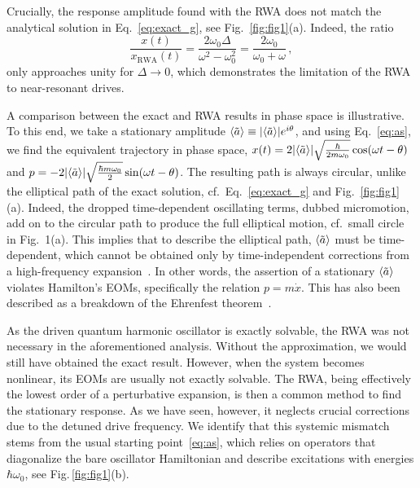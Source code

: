 Crucially, the response amplitude found with the RWA does not match the analytical solution in Eq.~\eqref{eq:exact_g}, see Fig.~\ref{fig:fig1}(a). Indeed, the ratio
\begin{equation}
\frac{x(t)}{x_{\text{RWA}}(t)} = \frac{2\omega_0\Delta}{\omega^2-\omega_0^2}= \frac{2\omega_0}{\omega_0+\omega}\,,
\end{equation}
only approaches unity for $\Delta \rightarrow 0$, which demonstrates the limitation of the RWA to near-resonant drives. 

A comparison  between the exact and RWA results in phase space is illustrative. To this end, we take a stationary amplitude $\langle\tilde{a}\rangle \equiv \abs{\langle\tilde{a}\rangle} e^{i \theta}$, and using Eq.~\eqref{eq:as}, we find the equivalent trajectory in phase space, $x(t) = 2\abs{\langle\tilde{a}\rangle} \sqrt{\frac{\hbar}{2 m \omega_0}} \cos(\omega t - \theta)$ and $p = -2\abs{\langle\tilde{a}\rangle}\sqrt{\frac{\hbar m \omega_0}{2}} \sin(\omega t-\theta)$. The resulting path is always circular, unlike the elliptical path of the exact solution, cf.~Eq.~\eqref{eq:exact_g} and Fig.~\ref{fig:fig1}(a).
Indeed, the dropped time-dependent oscillating terms, dubbed micromotion, add on to the circular path to produce the full elliptical motion, cf.~small circle in Fig.~1(a). This implies that to describe the elliptical path, $\langle\tilde{a}\rangle$ must be time-dependent, which cannot be obtained only by time-independent corrections from a high-frequency expansion~\cite{Mikami2016, Eckardt2017,Eckardt2015,Bukov2015,Goldman2014}.  
In other words, the assertion of a stationary $\langle\tilde{a}\rangle$ violates Hamilton's EOMs, specifically the relation $p = m \dot{x}$. This has also been described as a breakdown of the Ehrenfest theorem~\cite{Ford_1996}.

As the driven quantum harmonic oscillator is exactly solvable, the RWA was not necessary in the aforementioned analysis. Without the approximation, we would still have obtained the exact result. However, when the system becomes nonlinear, its EOMs are usually not exactly solvable. The RWA, being effectively the lowest order of a perturbative expansion, is then a common method to find the stationary response. As we have seen, however, it neglects crucial corrections due to the detuned drive frequency.
We identify that this systemic mismatch stems from the usual starting point~\eqref{eq:as}, which relies on operators that diagonalize the bare oscillator Hamiltonian and describe excitations with energies $\hbar \omega_0$, see Fig.\,\ref{fig:fig1}(b).

